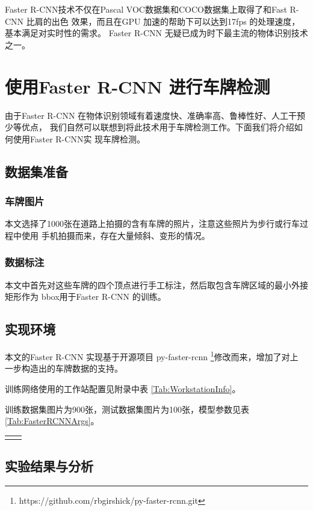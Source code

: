 Faster R-CNN技术不仅在Pascal VOC数据集和COCO数据集上取得了和Fast R-CNN 比肩的出色
效果，而且在GPU 加速的帮助下可以达到17fps 的处理速度，基本满足对实时性的需求。
Faster R-CNN 无疑已成为时下最主流的物体识别技术之一。

\section{使用Faster R-CNN 进行车牌检测}

由于Faster R-CNN 在物体识别领域有着速度快、准确率高、鲁棒性好、人工干预少等优点，
我们自然可以联想到将此技术用于车牌检测工作。下面我们将介绍如何使用Faster R-CNN实
现车牌检测。

\subsection{数据集准备}

\subsubsection{车牌图片}
本文选择了1000张在道路上拍摄的含有车牌的照片，注意这些照片为步行或行车过程中使用
手机拍摄而来，存在大量倾斜、变形的情况。

\subsubsection{数据标注}
本文中首先对这些车牌的四个顶点进行手工标注，然后取包含车牌区域的最小外接矩形作为
bbox用于Faster R-CNN 的训练。 

\subsection{实现环境}

本文的Faster R-CNN 实现基于开源项目 py-faster-rcnn
\footnote{https://github.com/rbgirshick/py-faster-rcnn.git}修改而来，增加了对上
一步构造出的车牌数据的支持。

训练网络使用的工作站配置见附录中表 \ref{Tab:WorkstationInfo}。

训练数据集图片为900张，测试数据集图片为100张，模型参数见表 \ref{Tab:FasterRCNNArgs}。

\begin{tabular}{|c|c|}
\caption{Faster R-CNN参数}\label{Tab:FasterRCNNArgs}
\centering
\hline
\hline
\end{tabular}

\subsection{实验结果与分析}

